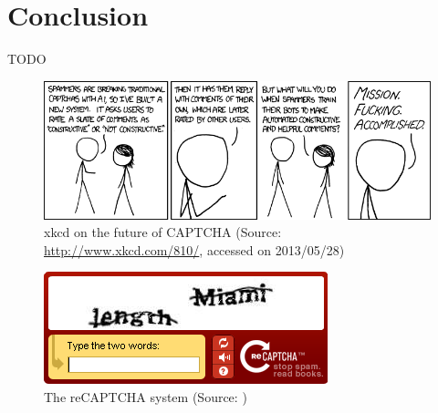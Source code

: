 \documentclass[pdftex,a4paper,12pt,twoside]{report}
\theoremstyle{plain} \newtheorem{theorem}{Theorem} \newtheorem{proposition}{Proposition} \newtheorem{lemma}{Lemma} \newtheorem*{corollary}{Corollary}
\theoremstyle{definition} \newtheorem{definition}{Definition} \newtheorem{conjecture}{Conjecture} \newtheorem*{example}{Example} \newtheorem{algorithm}{Algorithm}
\theoremstyle{remark} \newtheorem*{remark}{Remark} \newtheorem*{note}{Note} \newtheorem{case}{Case}
\begin{document}
\chapter{Conclusion}
\label{ch:conclusie}
TODO
%
%
\appendix
%
%
%


%
%
\listoffigures
\begin{figure}
	\centering
	\includegraphics[width=13.75cm]{./img/xkcd-captcha-evolution.png}
	\caption{xkcd on the future of CAPTCHA (Source: \url{http://www.xkcd.com/810/}, accessed on 2013/05/28)}
	\label{fig:xkcdCAPTCHA}
\end{figure}
\begin{figure}
	\centering
	\includegraphics[width=\textwidth]{./img/reCAPTCHA.png}
	\caption{The reCAPTCHA system (Source: \citep{UNDP2013})}
	\label{fig:reCAPTCHA}
\end{figure}
\end{document}

